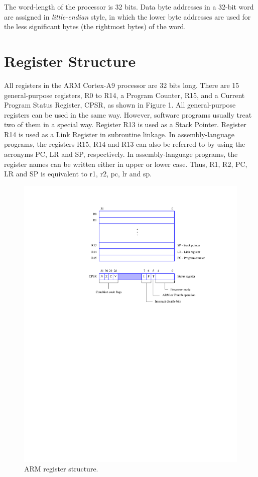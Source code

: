 \documentclass[11pt, twoside, pdftex]{article}
\begin{document}
The word-length of the processor is 32 bits. Data byte addresses in a 32-bit word 
are assigned in {\it little-endian} style, 
in which the lower byte addresses are used for the less
significant bytes (the rightmost bytes) of the word. 

\section{Register Structure}
All registers in the ARM Cortex-A9 processor are 32 bits long.
There are 15 general-purpose registers, R0 to R14,
a Program Counter, R15, and a Current Program Status
Register, CPSR, as shown in Figure 1.
All general-purpose registers can be used in the same way. 
However, software programs usually treat two of them in a special 
way. Register R13 is used as a Stack Pointer.
Register R14 is used as a Link Register in subroutine linkage.
In assembly-language programs, the registers
R15, R14 and R13 can also be referred to by using the acronyms
PC, LR and SP, respectively. In assembly-language programs, the
register names can be written either in upper or lower case.
Thus, R1, R2, PC, LR and SP is equivalent to r1, r2, pc, lr and
sp.

\begin{figure}[H]
   \begin{center}
      \includegraphics[scale=1]{figures/figure1.pdf}
   \caption{ARM register structure.} 
	 \label{fig:1}
	 \end{center}
\end{figure}
\end{document}
